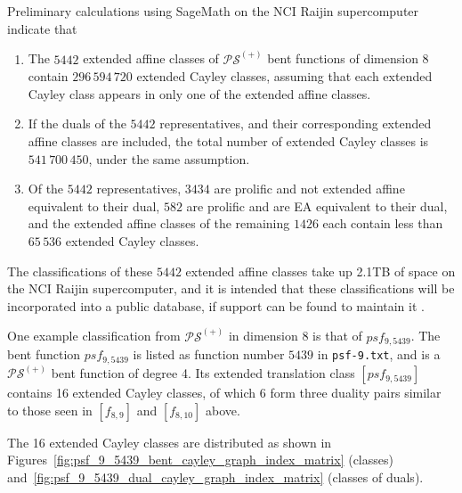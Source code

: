 \documentclass[12pt,a4paper]{article}
\begin{document}
Preliminary calculations using SageMath on the NCI Raijin supercomputer indicate that
\begin{enumerate}
 \item
The $5442$ extended affine classes of $\mathcal{PS}^{(+)}$ bent functions of dimension 8
contain $296\,594\,720$ extended Cayley classes, assuming that each extended Cayley class appears in only one of the extended affine classes.
 \item
If the duals of the $5442$ representatives, and their corresponding extended affine classes are included,
the total number of extended Cayley classes is $541\,700\,450$, under the same assumption.
 \item
Of the $5442$ representatives,
$3434$ are prolific and not extended affine equivalent to their dual,
$582$ are prolific and are EA equivalent to their dual,
and the extended affine classes of the remaining $1426$ each contain less than $65\,536$ extended Cayley classes.
\end{enumerate}
The classifications of these $5442$ extended affine classes take up 2.1TB of space on the NCI Raijin supercomputer,
and it is intended that these classifications will be incorporated into a public database, if support can be found to maintain it
\cite{Leo18Database}.


One example classification from $\mathcal{PS}^{(+)}$ in dimension 8 is that of $psf_{9,5439}$.
The bent function $psf_{9,5439}$ is listed as function number $5439$ in \texttt{psf-9.txt},
and is a $\mathcal{PS}^{(+)}$ bent function of degree 4.
Its extended translation class $[psf_{9,5439}]$ contains 16 extended Cayley classes,
of which 6 form three duality pairs similar to those seen in $[f_{8,9}]$ and $[f_{8,10}]$ above.

The 16 extended Cayley classes are distributed
as shown in Figures~\ref{fig:psf_9_5439_bent_cayley_graph_index_matrix} (classes) and~\ref{fig:psf_9_5439_dual_cayley_graph_index_matrix}
(classes of duals).
\end{document}

